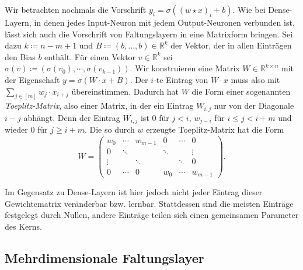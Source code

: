 \documentclass[paper=a4, 	%
		fontsize=11pt,
		abstract=true, 	%
		headsepline, 	%
		notitlepage	%
		]{scrartcl}
\theoremstyle{definition}
\newcommand{\R}{\mathbb{R}}
\newcommand{\fNat}[1]{[ #1 ]}
\begin{document}
\medskip

Wir betrachten nochmals die Vorschrift $y_i = \sigma\left( (w \star x)_i + b  \right)$.
Wie bei Dense-Layern, in denen jedes Input-Neuron mit jedem Output-Neuronen verbunden ist, lässt sich auch die Vorschrift von Faltungslayern in eine Matrixform bringen.
Sei dazu $k\coloneqq n-m+1$ und $B\coloneqq (b, \dots, b)\in\R^k$ der Vektor, der in allen Einträgen den Bias $b$ enthält.
Für einen Vektor $v\in\R^k$ sei $\sigma(v) \coloneqq (\sigma(v_0), \cdots, \sigma(v_{k-1}))$.
Wir konstruieren eine Matrix $W\in\R^{k\times n}$ mit der Eigenschaft $y = \sigma( W\cdot x + B )$.
Der $i$-te Eintrag von $W\cdot x$ muss also mit $\sum_{j\in\fNat{m}} w_j \cdot x_{i+j}$
übereinstimmen.
Dadurch hat $W$ die Form einer sogenannten \emph{Toeplitz-Matrix}, also einer Matrix, in der ein Eintrag $W_{i,j}$ nur von der Diagonale $i-j$ abhängt.
Denn der Eintrag $W_{i,j}$ ist $0$ für $j < i$, $w_{j-i}$ für $i \leq j < i+m$ und wieder $0$ für $j \geq i+m$.
Die so durch $w$ erzeugte Toeplitz-Matrix hat die Form
\[
    W = \begin{pmatrix}
            w_0 & \cdots & w_{m-1} & 0 & \cdots & 0 \\
            0 & \ddots & & \ddots  & & \vdots \\
            \vdots  & & \ddots & & \ddots & 0 \\[4pt]
             0 & \cdots & 0 & w_0 & \cdots & w_{m-1}
        \end{pmatrix}.
\]

Im Gegensatz zu Dense-Layern ist hier jedoch nicht jeder Eintrag dieser Gewichtematrix veränderbar bzw. lernbar.
Stattdessen sind die meisten Einträge festgelegt durch Nullen, andere Einträge teilen sich einen gemeinsamen Parameter des Kerns.



\subsection{Mehrdimensionale Faltungslayer}
\end{document}
